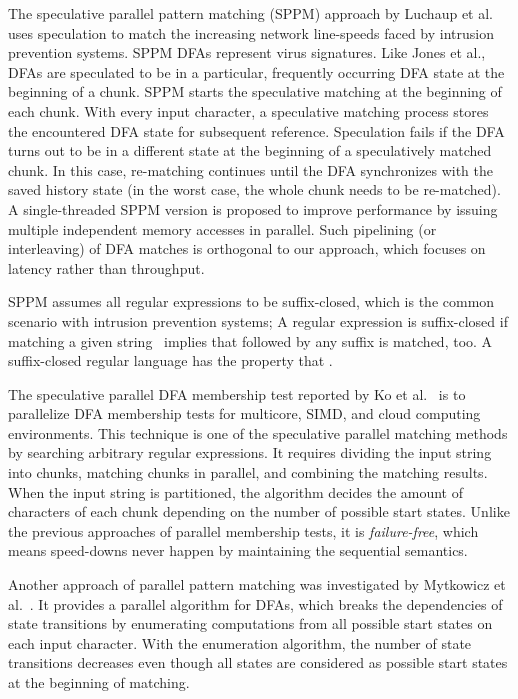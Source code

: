 \documentclass[10pt, conference, compsocconf]{IEEEtran}
\begin{document}
The speculative parallel pattern matching (SPPM) approach by
Luchaup et al.~\cite{Luchaup2011,Luchaup2009} uses speculation to match
the increasing network line-speeds
faced by intrusion prevention systems. SPPM DFAs represent virus
signatures. Like Jones et al.,
DFAs are speculated to be in a particular, frequently occurring DFA state
at the beginning of a chunk. SPPM starts the speculative matching
at the beginning of each chunk. With every input character, a
speculative matching process stores the encountered DFA
state for subsequent reference. Speculation fails if the DFA turns out
to be in a different state at the beginning of a speculatively matched
chunk. In this case, re-matching continues until the DFA
synchronizes with the saved history state (in the worst case, the
whole chunk needs to be re-matched). A single-threaded SPPM
version is proposed to improve performance by issuing multiple
independent memory accesses in parallel.
Such pipelining (or interleaving) of DFA matches is orthogonal to
our approach, which
focuses on latency rather than throughput.

SPPM assumes all regular expressions to be suffix-closed, which is the
common scenario with intrusion prevention systems;
A regular expression is suffix-closed if matching a given string~
implies that  followed by any suffix is matched, too. A suffix-closed
regular language has the property that
.

The speculative parallel DFA membership test reported by
Ko et al.~\cite{Ko2014} is to parallelize DFA membership tests
for multicore, SIMD, and cloud computing environments.
This technique is one of the speculative parallel matching methods
by searching arbitrary regular expressions. It requires dividing
the input string into chunks, matching chunks in parallel, and combining
the matching results. When the input string is partitioned, the
algorithm decides the amount of characters of each chunk depending on
the number of possible start states.
Unlike the previous approaches of parallel
membership tests, it is {\em failure-free\/}, which means speed-downs
never happen by maintaining the sequential semantics.

Another approach of parallel pattern matching was investigated by
Mytkowicz et al.~\cite{Mytkowicz2014}. It provides a parallel
algorithm for DFAs, which breaks the dependencies of state transitions
by enumerating computations from all possible start states on each
input character. With the enumeration algorithm, the number of
state transitions decreases even though all states are considered as
possible start states at the beginning of matching.
\end{document}

